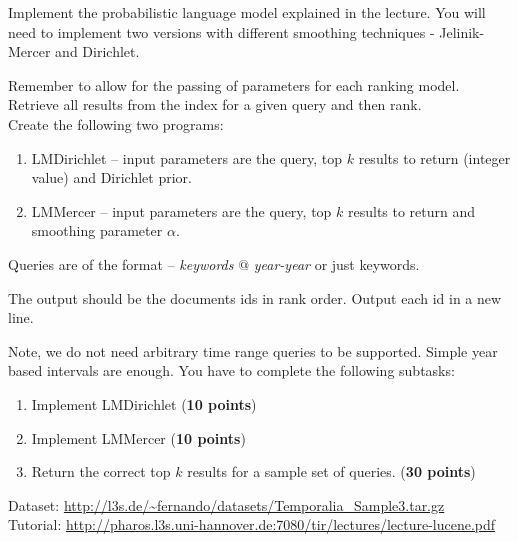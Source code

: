\begin{hwproblem}

Implement the probabilistic language model explained in the lecture. You will need to implement two versions with different smoothing techniques - Jelinik-Mercer and Dirichlet. 

Remember to allow for the passing of parameters for each ranking model. Retrieve all results from the index for a given query and then rank. 
\\ 
Create the following two programs:

\begin{enumerate}
	\item LMDirichlet -- input parameters are the query, top $k$ results to return (integer value) and Dirichlet prior.
	\item LMMercer -- input parameters are the query, top $k$ results to return and smoothing parameter $\alpha$.
\end{enumerate}

Queries are of the format -- \textit{keywords} $@$ \textit{year-year} or just keywords.

The output should be the documents ids in rank order. Output each id in a new line.

Note, we do not need arbitrary time range queries to be supported. Simple year based intervals are enough. You have to complete the following subtasks:

\begin{enumerate}
	\item Implement LMDirichlet (\textbf{10 points})
	\item Implement LMMercer (\textbf{10 points})
	\item Return the correct top $k$ results for a sample set of queries. (\textbf{30 points})
\end{enumerate}

Dataset: \url{http://l3s.de/~fernando/datasets/Temporalia_Sample3.tar.gz}
\\
Tutorial: \url{http://pharos.l3s.uni-hannover.de:7080/tir/lectures/lecture-lucene.pdf}
 
\hwsolution{

}

\end{hwproblem}





